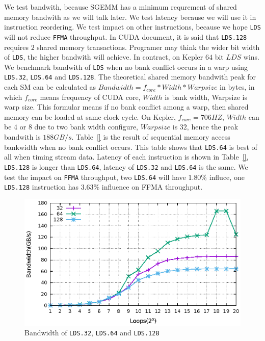 \documentclass{sig-alternate-05-2015}
\begin{document}
We test bandwith, because SGEMM has a minimum requrement of shared memory bandwith as we will talk later. We test latency
because we will use it in instruction reordering. We test impact on other instructions, because we hope {\tt LDS} will not
reduce {\tt FFMA} throughput.
In CUDA document, it is said that {\tt LDS.128} requires $2$ shared memory transactions.
Programer may think the wider bit width of {\tt LDS}, the higher bandwith will achieve. In contract, on Kepler $64$ bit
$LDS$ wins. We benchmark bandwith of {\tt LDS} when no bank conflict occurs in a warp using {\tt LDS.32}, {\tt LDS.64}
and {\tt LDS.128}.
The theoretical shared memory bandwith peak for each SM can be calculated as $Bandwidth=f_{core}*Width*Warpsize$ in
bytes, in which $f_{core}$ means frequency of CUDA core, $Width$ is bank width, Warpsize is warp size. This formular
means if no bank conflict among a warp, then shared memory can be loaded at same clock cycle. On Kepler,
$f_{core}=706HZ$, $Width$ can be $4$ or $8$ due to two bank width configure, $Warpsize$ is $32$, hence the peak bandwith is $188GB/s$.
Table~\ref{} is the result of sequential memory access bankwidth when no bank conflict occurs. This table shows that
{\tt LDS.64} is best of all when timing stream data.
Latency of each instruction is shown in Table~\ref{}, {\tt LDS.128} is longer than {\tt LDS.64}, latency of {\tt LDS.32}
and {\tt LDS.64} is the same.
We test the impact on {\tt FFMA} throughput, two {\tt LDS.64} will have 1.80\% influce, one {\tt LDS.128} instruction has
3.63\% influence on FFMA throughput.
\begin{figure}[htbp]
\begin{center}
\includegraphics[scale=0.6]{lds_bandwidth}
    \caption{ Bandwidth of {\tt LDS.32}, {\tt LDS.64} and {\tt LDS.128}}
\label{fig:lds_bw}
\end{center}
\end{figure}
\end{document}
